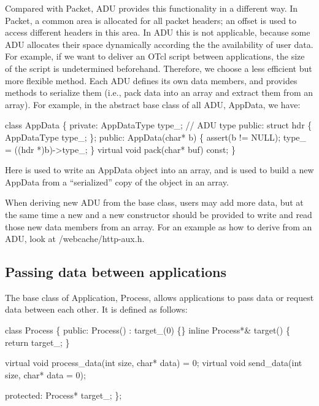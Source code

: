 Compared with Packet, ADU provides this functionality in a different
way. In Packet, a common area is allocated for all packet headers; an
offset is used to access different headers in this area. In ADU this
is not applicable, because some ADU allocates their space dynamically
according the the availability of user data. For example, if we want
to deliver an OTcl script between applications, the size of the script
is undetermined beforehand. Therefore, we choose a less efficient but
more flexible method. Each ADU defines its own data members, and
provides methods to serialize them (i.e., pack data into an array and
extract them from an array). For example, in the abstract base class
of all ADU, AppData, we have:

\begin{program}
        class AppData \{
        private:
                AppDataType type_;  // ADU type
        public:
                struct hdr \{
                        AppDataType type_;
                \};
        public:
                AppData(char* b) \{
                        assert(b != NULL);
                        type_ = ((hdr *)b)->type_;
                \}
                virtual void pack(char* buf) const;
        \}
\end{program}

Here  is used to write an AppData object
into an array, and  is used to build a new
AppData from a ``serialized'' copy of the object in an array.

When deriving new ADU from the base class, users may add more data,
but at the same time a new  and a new constructor 
should be provided to write and read those new data members from an
array. For an example as how to derive from an ADU, look at 
\ns/webcache/http-aux.h.

\subsection{Passing data between applications}

The base class of Application, Process, allows applications to pass
data or request data between each other. It is defined as follows:
\begin{program}
        class Process \{
        public: 
                Process() : target_(0) \{\}
                inline Process*& target() \{ return target_; \}

                virtual void process_data(int size, char* data) = 0;
                virtual void send_data(int size, char* data = 0);

        protected:
                Process* target_;
        \};
\end{program}

